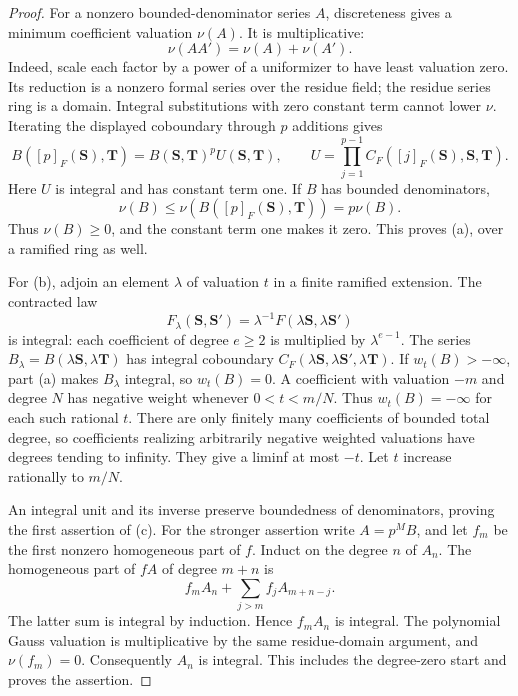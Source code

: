 \documentclass[11pt,a4paper]{article}
\theoremstyle{definition}\newtheorem{remark}[theorem]{Remark}
\begin{document}
\begin{proof}
For a nonzero bounded-denominator series $A$, discreteness gives a minimum coefficient valuation $\nu(A)$. It is multiplicative:
\[
 \nu(AA')=\nu(A)+\nu(A').
\]
Indeed, scale each factor by a power of a uniformizer to have least valuation zero. Its reduction is a nonzero formal series over the residue field; the residue series ring is a domain. Integral substitutions with zero constant term cannot lower $\nu$. Iterating the displayed coboundary through $p$ additions gives
\[
 B([p]_F(\mathbf S),\mathbf T)=B(\mathbf S,\mathbf T)^p U(\mathbf S,\mathbf T),\qquad
 U=\prod_{j=1}^{p-1}C_F([j]_F(\mathbf S),\mathbf S,\mathbf T).
\]
Here $U$ is integral and has constant term one. If $B$ has bounded denominators,
\[
 \nu(B)\le\nu(B([p]_F(\mathbf S),\mathbf T))=p\nu(B).
\]
Thus $\nu(B)\ge0$, and the constant term one makes it zero. This proves (a), over a ramified ring as well.

For (b), adjoin an element $\lambda$ of valuation $t$ in a finite ramified extension. The contracted law
\[
 F_\lambda(\mathbf S,\mathbf S')=\lambda^{-1}F(\lambda\mathbf S,\lambda\mathbf S')
\]
is integral: each coefficient of degree $e\ge2$ is multiplied by $\lambda^{e-1}$. The series $B_\lambda=B(\lambda\mathbf S,\lambda\mathbf T)$ has integral coboundary $C_F(\lambda\mathbf S,\lambda\mathbf S',\lambda\mathbf T)$. If $w_t(B)>-\infty$, part (a) makes $B_\lambda$ integral, so $w_t(B)=0$. A coefficient with valuation $-m$ and degree $N$ has negative weight whenever $0<t<m/N$. Thus $w_t(B)=-\infty$ for each such rational $t$. There are only finitely many coefficients of bounded total degree, so coefficients realizing arbitrarily negative weighted valuations have degrees tending to infinity. They give a liminf at most $-t$. Let $t$ increase rationally to $m/N$.

An integral unit and its inverse preserve boundedness of denominators, proving the first assertion of (c). For the stronger assertion write $A=p^MB$, and let $f_m$ be the first nonzero homogeneous part of $f$. Induct on the degree $n$ of $A_n$. The homogeneous part of $fA$ of degree $m+n$ is
\[
 f_m A_n+\sum_{j>m}f_j A_{m+n-j}.
\]
The latter sum is integral by induction. Hence $f_mA_n$ is integral. The polynomial Gauss valuation is multiplicative by the same residue-domain argument, and $\nu(f_m)=0$. Consequently $A_n$ is integral. This includes the degree-zero start and proves the assertion.


\end{proof}
\end{document}
